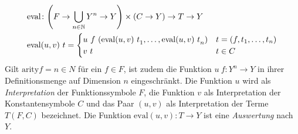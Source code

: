\documentclass{scrartcl}
\numberwithin{figure}{section} %
\DeclarePairedDelimiter\paren{(}{)}
\theoremstyle{definition} %
\newcommand{\elems}[3]{{#1}_{#2}, \dots, {#1}_{#3}}
\newcommand{\tOneN}{\elems t 1 n}
\begin{document}
\begin{equation*}
    \begin{split}
	\mathrm{eval} &\colon \paren*{F \rightarrow \bigcup_{n \in \mathbb{N}} Y^n \rightarrow Y} \times (C \rightarrow Y) \rightarrow T \rightarrow Y\\
	\mathrm{eval} &(u, v)~t = \begin{cases}
		u~f~(\elems {\mathrm{eval}(u, v)~t} 1 n) & t = (f, \tOneN)\\
		v~t                                      & t \in C\\
		\end{cases}
    \end{split}
\end{equation*}
Gilt $\mathrm{arity} f = n \in N$ für ein $f \in F$, ist zudem die Funktion $u~f \colon Y^n \rightarrow Y$ in ihrer Definitionsmenge auf Dimension $n$ eingeschränkt. 
Die Funktion $u$ wird als \emph{Interpretation} der Funktionssymbole $F$, die Funktion $v$ als Interpretation der Konstantensymbole $C$ und das Paar $(u, v)$ als Interpretation der Terme $T(F, C)$ bezeichnet. Die Funktion $\mathrm{eval}(u, v) \colon T \rightarrow Y$ ist eine \emph{Auswertung} nach $Y$. 
\\~\\
\end{document}
